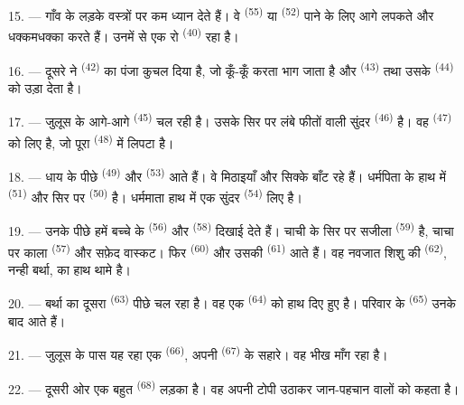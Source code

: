 15. --- गाँव के लड़के वस्त्रों पर कम ध्यान देते हैं। वे 
\textsuperscript{(55)} या  \textsuperscript{(52)} पाने के लिए आगे
लपकते और धक्कमधक्का करते हैं। उनमें से एक रो \textsuperscript{(40)} रहा है।

16. --- दूसरे ने  \textsuperscript{(42)} का पंजा कुचल दिया है, जो
कूँ-कूँ करता भाग जाता है और  \textsuperscript{(43)} तथा उसके
 \textsuperscript{(44)} को उड़ा देता है।

\VUsaut{5.0mm}
\VUsaut{4.0mm}

17. --- जुलूस के आगे-आगे  \textsuperscript{(45)} चल रही है। उसके सिर
पर लंबे फीतों वाली सुंदर  \textsuperscript{(46)} है। वह
 \textsuperscript{(47)} को लिए है, जो पूरा 
\textsuperscript{(48)} में लिपटा है।

18. --- धाय के पीछे  \textsuperscript{(49)} और
 \textsuperscript{(53)} आते हैं। वे मिठाइयाँ और सिक्के बाँट रहे
हैं। धर्मपिता के हाथ में  \textsuperscript{(51)} और सिर पर
 \textsuperscript{(50)} है। धर्ममाता हाथ में एक सुंदर
 \textsuperscript{(54)} लिए है।

19. --- उनके पीछे हमें बच्चे के  \textsuperscript{(56)} और
 \textsuperscript{(58)} दिखाई देते हैं। चाची के सिर पर सजीला
 \textsuperscript{(59)} है, चाचा पर काला 
\textsuperscript{(57)} और सफ़ेद वास्कट। फिर 
\textsuperscript{(60)} और उसकी  \textsuperscript{(61)} आते हैं। वह
नवजात शिशु की  \textsuperscript{(62)}, नन्ही बर्था, का हाथ थामे है।

20. --- बर्था का दूसरा  \textsuperscript{(63)} पीछे चल रहा है। वह एक
 \textsuperscript{(64)} को हाथ दिए हुए है। परिवार के
 \textsuperscript{(65)} उनके बाद आते हैं।

\VUsaut{4.6mm}
\VUsaut{3.4mm}

21. --- जुलूस के पास यह रहा एक  \textsuperscript{(66)}, अपनी
 \textsuperscript{(67)} के सहारे। वह भीख माँग रहा है।

22. --- दूसरी ओर एक बहुत  \textsuperscript{(68)} लड़का है। वह अपनी
टोपी उठाकर जान-पहचान वालों को  कहता है।

